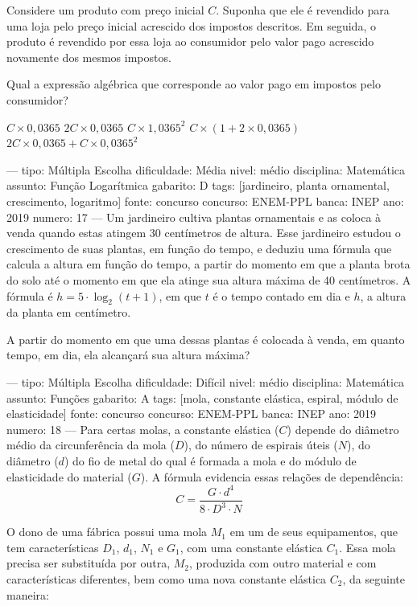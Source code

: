 Considere um produto com preço inicial \( C \). Suponha que ele é revendido para uma loja pelo preço inicial acrescido dos impostos descritos. Em seguida, o produto é revendido por essa loja ao consumidor pelo valor pago acrescido novamente dos mesmos impostos.

Qual a expressão algébrica que corresponde ao valor pago em impostos pelo consumidor?
\begin{choices}
\choice \( C \times 0{,}0365 \)
\choice \( 2C \times 0{,}0365 \)
\choice \( C \times 1{,}0365^2 \)
\choice \( C \times (1 + 2 \times 0{,}0365) \)
\correctchoice \( 2C \times 0{,}0365 + C \times 0{,}0365^2 \)
\end{choices}

---
tipo: Múltipla Escolha
dificuldade: Média
nivel: médio
disciplina: Matemática
assunto: Função Logarítmica
gabarito: D
tags: [jardineiro, planta ornamental, crescimento, logaritmo]
fonte: concurso
concurso: ENEM-PPL
banca: INEP
ano: 2019
numero: 17
---
\question
Um jardineiro cultiva plantas ornamentais e as coloca à venda quando estas atingem 30 centímetros de altura. Esse jardineiro estudou o crescimento de suas plantas, em função do tempo, e deduziu uma fórmula que calcula a altura em função do tempo, a partir do momento em que a planta brota do solo até o momento em que ela atinge sua altura máxima de 40 centímetros. A fórmula é \( h = 5 \cdot \log_2(t + 1) \), em que \( t \) é o tempo contado em dia e \( h \), a altura da planta em centímetro.

A partir do momento em que uma dessas plantas é colocada à venda, em quanto tempo, em dia, ela alcançará sua altura máxima?
\begin{oneparchoices}
\end{oneparchoices}

---
tipo: Múltipla Escolha
dificuldade: Difícil
nivel: médio
disciplina: Matemática
assunto: Funções
gabarito: A
tags: [mola, constante elástica, espiral, módulo de elasticidade]
fonte: concurso
concurso: ENEM-PPL
banca: INEP
ano: 2019
numero: 18
---
\question
Para certas molas, a constante elástica (\( C \)) depende do diâmetro médio da circunferência da mola (\( D \)), do número de espirais úteis (\( N \)), do diâmetro (\( d \)) do fio de metal do qual é formada a mola e do módulo de elasticidade do material (\( G \)). A fórmula evidencia essas relações de dependência:
\[ C = \frac{G \cdot d^4}{8 \cdot D^3 \cdot N} \]

O dono de uma fábrica possui uma mola \( M_1 \) em um de seus equipamentos, que tem características \( D_1 \), \( d_1 \), \( N_1 \) e \( G_1 \), com uma constante elástica \( C_1 \). Essa mola precisa ser substituída por outra, \( M_2 \), produzida com outro material e com características diferentes, bem como uma nova constante elástica \( C_2 \), da seguinte maneira:

